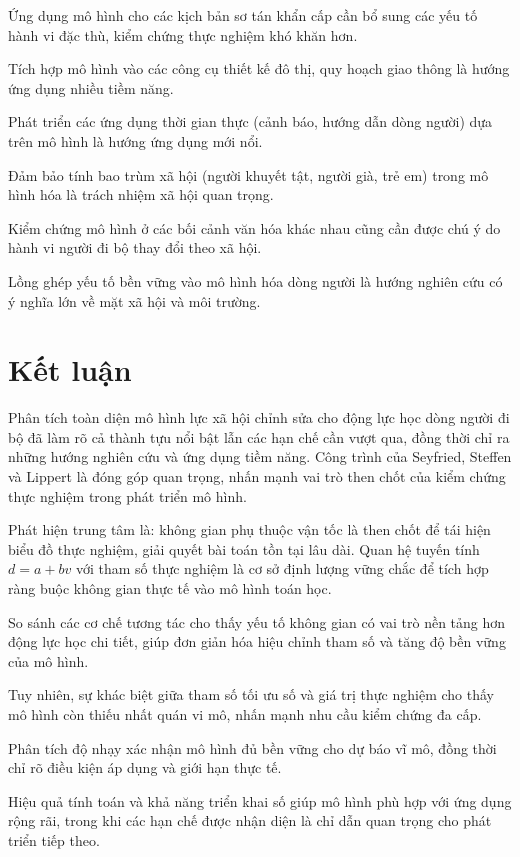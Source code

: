 \documentclass[12pt,a4paper]{article}
\begin{document}
Ứng dụng mô hình cho các kịch bản sơ tán khẩn cấp cần bổ sung các yếu tố hành vi đặc thù, kiểm chứng thực nghiệm khó khăn hơn.

Tích hợp mô hình vào các công cụ thiết kế đô thị, quy hoạch giao thông là hướng ứng dụng nhiều tiềm năng.

Phát triển các ứng dụng thời gian thực (cảnh báo, hướng dẫn dòng người) dựa trên mô hình là hướng ứng dụng mới nổi.

Đảm bảo tính bao trùm xã hội (người khuyết tật, người già, trẻ em) trong mô hình hóa là trách nhiệm xã hội quan trọng.

Kiểm chứng mô hình ở các bối cảnh văn hóa khác nhau cũng cần được chú ý do hành vi người đi bộ thay đổi theo xã hội.

Lồng ghép yếu tố bền vững vào mô hình hóa dòng người là hướng nghiên cứu có ý nghĩa lớn về mặt xã hội và môi trường.

\section{Kết luận}

Phân tích toàn diện mô hình lực xã hội chỉnh sửa cho động lực học dòng người đi bộ đã làm rõ cả thành tựu nổi bật lẫn các hạn chế cần vượt qua, đồng thời chỉ ra những hướng nghiên cứu và ứng dụng tiềm năng. Công trình của Seyfried, Steffen và Lippert là đóng góp quan trọng, nhấn mạnh vai trò then chốt của kiểm chứng thực nghiệm trong phát triển mô hình.

Phát hiện trung tâm là: không gian phụ thuộc vận tốc là then chốt để tái hiện biểu đồ thực nghiệm, giải quyết bài toán tồn tại lâu dài. Quan hệ tuyến tính $d = a + bv$ với tham số thực nghiệm là cơ sở định lượng vững chắc để tích hợp ràng buộc không gian thực tế vào mô hình toán học.

So sánh các cơ chế tương tác cho thấy yếu tố không gian có vai trò nền tảng hơn động lực học chi tiết, giúp đơn giản hóa hiệu chỉnh tham số và tăng độ bền vững của mô hình.

Tuy nhiên, sự khác biệt giữa tham số tối ưu số và giá trị thực nghiệm cho thấy mô hình còn thiếu nhất quán vi mô, nhấn mạnh nhu cầu kiểm chứng đa cấp.

Phân tích độ nhạy xác nhận mô hình đủ bền vững cho dự báo vĩ mô, đồng thời chỉ rõ điều kiện áp dụng và giới hạn thực tế.

Hiệu quả tính toán và khả năng triển khai số giúp mô hình phù hợp với ứng dụng rộng rãi, trong khi các hạn chế được nhận diện là chỉ dẫn quan trọng cho phát triển tiếp theo.
\end{document}
